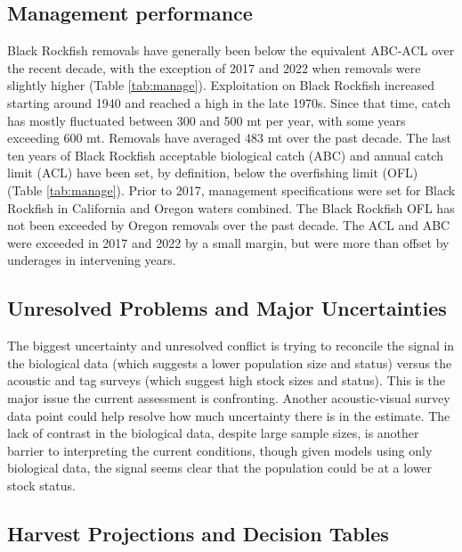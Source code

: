 \documentclass[11pt,
  english,
  letterpaper,
]{article}
\begin{document}
\hypertarget{management-performance-1}{%
\subsection{Management performance}\label{management-performance-1}}

Black Rockfish removals have generally been below the equivalent ABC-ACL over the recent decade, with the exception of 2017 and 2022 when removals were slightly higher (Table \ref{tab:manage}). Exploitation on Black Rockfish increased starting around 1940 and reached a high in the late 1970s. Since that time, catch has mostly fluctuated between 300 and 500 mt per year, with some years exceeding 600 mt. Removals have averaged 483 mt over the past decade. The last ten years of Black Rockfish acceptable biological catch (ABC) and annual catch limit (ACL) have been set, by definition, below the overfishing limit (OFL) (Table \ref{tab:manage}). Prior to 2017, management specifications were set for Black Rockfish in California and Oregon waters combined. The Black Rockfish OFL has not been exceeded by Oregon removals over the past decade. The ACL and ABC were exceeded in 2017 and 2022 by a small margin, but were more than offset by underages in intervening years.

\hypertarget{unresolved-problems-and-major-uncertainties-2}{%
\subsection{Unresolved Problems and Major Uncertainties}\label{unresolved-problems-and-major-uncertainties-2}}

The biggest uncertainty and unresolved conflict is trying to reconcile the signal in the biological data (which suggests a lower population size and status) versus the acoustic and tag surveys (which suggest high stock sizes and status). This is the major issue the current assessment is confronting. Another acoustic-visual survey data point could help resolve how much uncertainty there is in the estimate. The lack of contrast in the biological data, despite large sample sizes, is another barrier to interpreting the current conditions, though given models using only biological data, the signal seems clear that the population could be at a lower stock status.

\hypertarget{harvest-projections-and-decision-tables}{%
\subsection{Harvest Projections and Decision Tables}\label{harvest-projections-and-decision-tables}}
\end{document}
